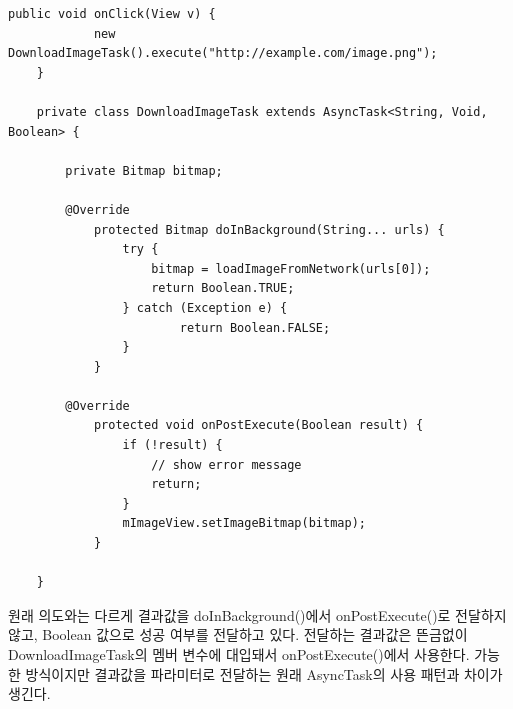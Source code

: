 \begin{lstlisting}[frame=single]
	public void onClick(View v) {
    		new DownloadImageTask().execute("http://example.com/image.png");
	}

	private class DownloadImageTask extends AsyncTask<String, Void, Boolean> {
	
		private Bitmap bitmap;
		
		@Override
    		protected Bitmap doInBackground(String... urls) {
        		try {
        			bitmap = loadImageFromNetwork(urls[0]);
        			return Boolean.TRUE;
        		} catch (Exception e) {
        				return Boolean.FALSE;
        		}
    		}

      	@Override
	    	protected void onPostExecute(Boolean result) {
	    		if (!result) {
	    			// show error message
	    			return;
	    		}
	        	mImageView.setImageBitmap(bitmap);
	    	}
	    	
	}	
\end{lstlisting}
원래 의도와는 다르게 결과값을 doInBackground()에서 onPostExecute()로 전달하지 않고, Boolean 값으로 성공 여부를 전달하고 있다. 
전달하는 결과값은 뜬금없이 DownloadImageTask의 멤버 변수에 대입돼서 onPostExecute()에서 사용한다.
가능한 방식이지만 결과값을 파라미터로 전달하는 원래 AsyncTask의 사용 패턴과 차이가 생긴다.\\

